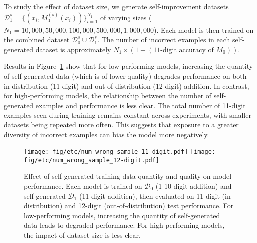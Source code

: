 To study the effect of dataset size, we generate self-improvement datasets \( \mathcal{D}_1^s = \{(x_i, M_0^{(s)}(x_i))\}_{i=1}^{N_1} \) of varying sizes (\( N_1 = 10,000, 50,000, 100,000, 500,000, 1,000,000 \)). Each model is then trained on the combined dataset \( \mathcal{D}_0^s \cup \mathcal{D}_1^s \). The number of incorrect examples in each self-generated dataset is approximately \( N_1 \times (1 - (\text{11-digit accuracy of } M_0)) \).

Results in Figure~\ref{fig:si_performance_by_num_samples} show that for low-performing models, increasing the quantity of self-generated data (which is of lower quality) degrades performance on both in-distribution (11-digit) and out-of-distribution (12-digit) addition. In contrast, for high-performing models, the relationship between the number of self-generated examples and performance is less clear. The total number of 11-digit examples seen during training remains constant across experiments, with smaller datasets being repeated more often. This suggests that exposure to a greater diversity of incorrect examples can bias the model more negatively.



\begin{figure}
    \centering
    \texttt{[image: fig/etc/num\_wrong\_sample\_11-digit.pdf]}
    \hspace{1mm}
    \texttt{[image: fig/etc/num\_wrong\_sample\_12-digit.pdf]}

    \caption{Effect of self-generated training data quantity and quality on model performance. Each model is trained on \( \mathcal{D}_0 \) (1-10 digit addition) and self-generated \( \mathcal{D}_1 \) (11-digit addition), then evaluated on 11-digit (in-distribution) and 12-digit (out-of-distribution) test performance. For low-performing models, increasing the quantity of self-generated data leads to degraded performance. For high-performing models, the impact of dataset size is less clear.}
    \label{fig:si_performance_by_num_samples}
\end{figure}







